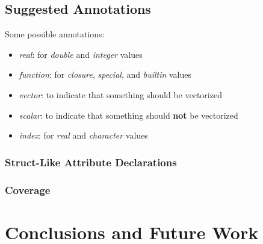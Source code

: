 \documentclass[acmsmall,10pt,review,anonymous]{acmart}\settopmatter{printfolios=true,printccs=false,printacmref=false}
\begin{document}
%
%
%
%
\subsection{Suggested Annotations}


Some possible annotations:

\begin{itemize}
    \item \textit{real}: for \textit{double} and \textit{integer} values
    \item \textit{function}: for \textit{closure}, \textit{special}, and \textit{builtin} values
    \item \textit{vector}: to indicate that something should be vectorized
    \item \textit{scalar}: to indicate that something should \textbf{not} be vectorized
    \item \textit{index}: for \textit{real} and \textit{character} values
\end{itemize}

%
%
\subsubsection{Struct-Like Attribute Declarations}


%
%
\subsubsection{Coverage}


%
%
%
%
%
%
\section{Conclusions and Future Work}



\end{document}
